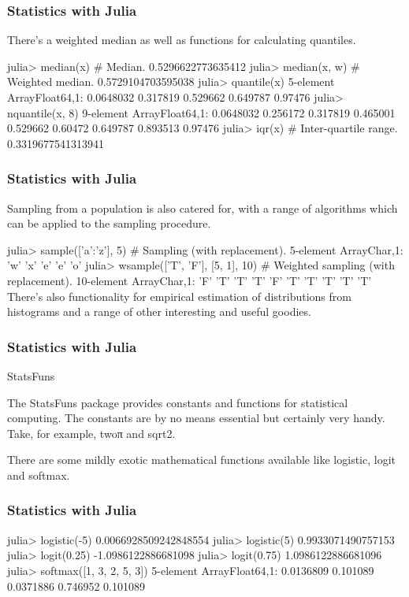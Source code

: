 \begin{frame}
	\frametitle{Statistics with Julia}
	\large
There’s a weighted median as well as functions for calculating quantiles.

julia> median(x)                           # Median.
0.5296622773635412
julia> median(x, w)                        # Weighted median.
0.5729104703595038
julia> quantile(x)
5-element Array{Float64,1}:
 0.0648032
 0.317819 
 0.529662 
 0.649787 
 0.97476  
julia> nquantile(x, 8)
9-element Array{Float64,1}:
 0.0648032
 0.256172 
 0.317819 
 0.465001 
 0.529662 
 0.60472  
 0.649787 
 0.893513 
 0.97476  
julia> iqr(x)                              # Inter-quartile range.
0.3319677541313941
\end{frame}
\begin{frame}
	\frametitle{Statistics with Julia}
	\large
Sampling from a population is also catered for, with a range of algorithms which can be applied to the sampling procedure.

julia> sample(['a':'z'], 5)                # Sampling (with replacement).
5-element Array{Char,1}:
 'w'
 'x'
 'e'
 'e'
 'o'
julia> wsample(['T', 'F'], [5, 1], 10)     # Weighted sampling (with replacement).
10-element Array{Char,1}:
 'F'
 'T'
 'T'
 'T'
 'F'
 'T'
 'T'
 'T'
 'T'
 'T'
There’s also functionality for empirical estimation of distributions from histograms and a range of other interesting and useful goodies.
\end{frame}
\begin{frame}
	\frametitle{Statistics with Julia}
	\large
StatsFuns

The StatsFuns package provides constants and functions for statistical computing. The constants are by no means essential but certainly very handy. Take, for example, twoπ and sqrt2.

There are some mildly exotic mathematical functions available like logistic, logit and softmax.
\end{frame}
\begin{frame}
	\frametitle{Statistics with Julia}
	\large
julia> logistic(-5)
0.0066928509242848554
julia> logistic(5)
0.9933071490757153
julia> logit(0.25)
-1.0986122886681098
julia> logit(0.75)
1.0986122886681096
julia> softmax([1, 3, 2, 5, 3])
5-element Array{Float64,1}:
 0.0136809
 0.101089 
 0.0371886
 0.746952 
 0.101089 
\end{frame}
